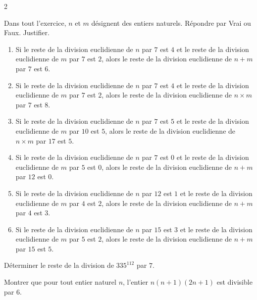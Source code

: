 \documentclass[a4paper,12pt]{article}
\begin{document}
\begin{multicols}{2}
\begin{exercice}[title=Exercice 15 $\quad \star \star \quad$ { [Calculer, Communiquer] }]{}{}
    Dans tout l'exercice, $n$ et $m$ désignent des entiers naturels. Répondre par Vrai ou Faux. Justifier.
    
    \begin{enumerate}
        \item Si le reste de la division euclidienne de $n$ par $7$ est $4$ et le reste de la division euclidienne de $m$ par $7$ est $2$, alors le reste de la division euclidienne de $n + m$ par $7$ est $6$.
        \item Si le reste de la division euclidienne de $n$ par $7$ est $4$ et le reste de la division euclidienne de $m$ par $7$ est $2$, alors le reste de la division euclidienne de $n \times m$ par $7$ est $8$.
        \item Si le reste de la division euclidienne de $n$ par $7$ est $5$ et le reste de la division euclidienne de $m$ par $10$ est $5$, alors le reste de la division euclidienne de $n \times m$ par $17$ est $5$.
        \item Si le reste de la division euclidienne de $n$ par $7$ est $0$ et le reste de la division euclidienne de $m$ par $5$ est $0$, alors le reste de la division euclidienne de $n + m$ par $12$ est $0$.
        \item Si le reste de la division euclidienne de $n$ par $12$ est $1$ et le reste de la division euclidienne de $m$ par $4$ est $2$, alors le reste de la division euclidienne de $n + m$ par $4$ est $3$.
        \item Si le reste de la division euclidienne de $n$ par $15$ est $3$ et le reste de la division euclidienne de $m$ par $5$ est $2$, alors le reste de la division euclidienne de $n + m$ par $15$ est $5$.
    \end{enumerate}
    \end{exercice}
    
    
    \begin{exercice}[title=Exercice 16 $\quad \star \star \quad$ { [Chercher, Calculer] }]{}{}
    Déterminer le reste de la division de $335^{112}$ par $7$.
    \end{exercice}
    
    \begin{exercice}[title=Exercice 17 $\quad \star \quad$ { [Calculer, Raisonner] }]{}{}
    Montrer que pour tout entier naturel $n$, l’entier $n(n+1)(2n+1)$ est divisible par $6$.
    \end{exercice}
    

\end{multicols}
\end{document}

